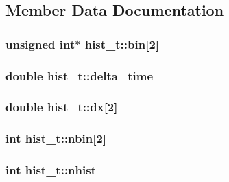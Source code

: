 \subsection{\-Member \-Data \-Documentation}
\hypertarget{structhist__t_ac123566faef138b1b831429f9c45d899}{
\subsubsection[{bin}]{\setlength{\rightskip}{0pt plus 5cm}unsigned int$\ast$ {\bf hist\-\_\-t\-::bin}\mbox{[}2\mbox{]}}}\label{structhist__t_ac123566faef138b1b831429f9c45d899}
\hypertarget{structhist__t_abc95afe0bd438edcac135ed480a5c7fc}{
\subsubsection[{delta\-\_\-time}]{\setlength{\rightskip}{0pt plus 5cm}double {\bf hist\-\_\-t\-::delta\-\_\-time}}}\label{structhist__t_abc95afe0bd438edcac135ed480a5c7fc}
\hypertarget{structhist__t_a5f5fcefa055ffed70f6b673ff3ee18d6}{
\subsubsection[{dx}]{\setlength{\rightskip}{0pt plus 5cm}double {\bf hist\-\_\-t\-::dx}\mbox{[}2\mbox{]}}}\label{structhist__t_a5f5fcefa055ffed70f6b673ff3ee18d6}
\hypertarget{structhist__t_a98c2cd03eb2e6f1ebe45d7b2b19f3717}{
\subsubsection[{nbin}]{\setlength{\rightskip}{0pt plus 5cm}int {\bf hist\-\_\-t\-::nbin}\mbox{[}2\mbox{]}}}\label{structhist__t_a98c2cd03eb2e6f1ebe45d7b2b19f3717}
\hypertarget{structhist__t_a50657a4faea2e666341e1213a51a1523}{
\subsubsection[{nhist}]{\setlength{\rightskip}{0pt plus 5cm}int {\bf hist\-\_\-t\-::nhist}}}\label{structhist__t_a50657a4faea2e666341e1213a51a1523}
